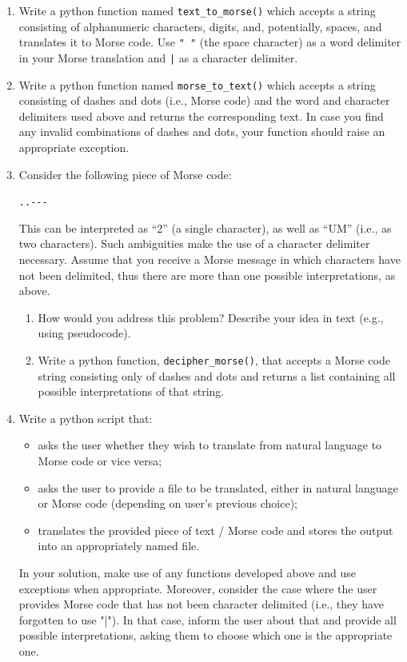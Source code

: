 \documentclass[a4paper, 11pt]{article}
\theoremstyle{definition}
\begin{document}
\begin{enumerate}[label = E\arabic*.]
\begin{enumerate}
			\item Write a python function named \texttt{text\_to\_morse()} which accepts a string consisting of alphanumeric characters, digits, and, potentially, spaces, and translates it to Morse code. Use \texttt{" "} (the space character) as a word delimiter in your Morse translation and \texttt{|} as a character delimiter.
			\item Write a python function named \texttt{morse\_to\_text()} which accepts a string consisting of dashes and dots (i.e., Morse code) and the word and character delimiters used above and returns the corresponding text. In case you find any invalid combinations of dashes and dots, your function should raise an appropriate exception.
			\item Consider the following piece of Morse code:
			\begin{center}
				\texttt{..{-}{-}{-}}
			\end{center}
			This can be interpreted as ``2'' (a single character), as well as ``UM'' (i.e., as two characters). Such ambiguities make the use of a character delimiter necessary. Assume that you receive a Morse message in which characters have not been delimited, thus there are more than one possible interpretations, as above.
			\begin{enumerate}
				\item How would you address this problem? Describe your idea in text (e.g., using pseudocode).
				\item Write a python function, \texttt{decipher\_morse()}, that accepts a Morse code string consisting only of dashes and dots and returns a list containing all possible interpretations of that string.
			\end{enumerate}
			\item Write a python script that:
			\begin{itemize}
				\item asks the user whether they wish to translate from natural language to Morse code or vice versa;
				\item asks the user to provide a file to be translated, either in natural language or Morse code (depending on user's previous choice);
				\item translates the provided piece of text / Morse code and stores the output into an appropriately named file.
			\end{itemize}
			In your solution, make use of any functions developed above and use exceptions when appropriate. Moreover, consider the case where the user provides Morse code that has not been character delimited (i.e., they have forgotten to use "|"). In that case, inform the user about that and provide all possible interpretations, asking them to choose which one is the appropriate one.

\end{enumerate}
\end{enumerate}
\end{document}
